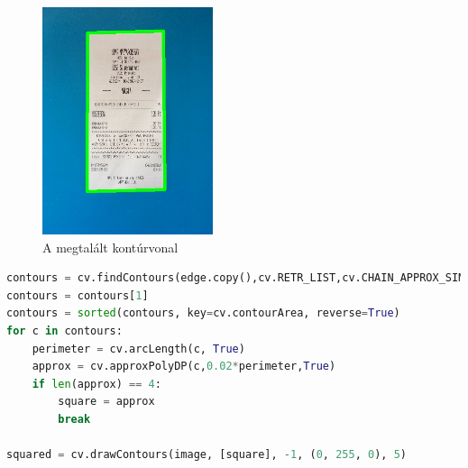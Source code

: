 \documentclass[a4paper,12pt]{article}
\begin{document}
\begin{figure}[h]
	\centering
	\includegraphics[width=5cm]{5d_squared}
	\caption{A megtalált kontúrvonal}
\end{figure}


\begin{lstlisting}[language=Python, caption=Kontúr kiszámolása és megjelenítése]
contours = cv.findContours(edge.copy(),cv.RETR_LIST,cv.CHAIN_APPROX_SIMPLE)
contours = contours[1]
contours = sorted(contours, key=cv.contourArea, reverse=True)
for c in contours:
    perimeter = cv.arcLength(c, True) 
    approx = cv.approxPolyDP(c,0.02*perimeter,True) 
    if len(approx) == 4:
        square = approx
        break

squared = cv.drawContours(image, [square], -1, (0, 255, 0), 5)
\end{lstlisting}
\end{document}
